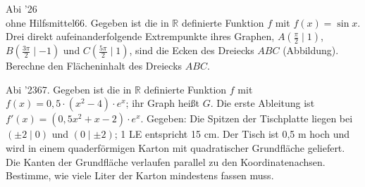 \documentclass[11pt]{article}
\begin{document}
\begin{pfaufg}{Abi ’26\\ohne Hilfsmittel}{66.}{}
Gegeben ist die in $\mathbb{R}$ definierte Funktion $f$ mit $f(x) = \sin x$. Drei direkt aufeinanderfolgende Extrempunkte ihres Graphen, $A\left(\tfrac{\pi}{2} \mid 1\right)$, $B\left(\tfrac{3\pi}{2} \mid -1\right)$ und $C\left(\tfrac{5\pi}{2} \mid 1\right)$, sind die Ecken des Dreiecks $ABC$ (Abbildung). Berechne den Flächeninhalt des Dreiecks $ABC$.
\par\smallskip\noindent {}\par
{}
\end{pfaufg}
\pfgruppe{}
\begin{pfaufg}{Abi ’23}{67.}{}
Gegeben ist die in $\mathbb{R}$ definierte Funktion $f$ mit $f(x) = 0{,}5\cdot(x^2 - 4)\cdot e^x$; ihr Graph heißt $G$. Die erste Ableitung ist $f'(x) = (0{,}5x^2 + x - 2)\cdot e^x$. Gegeben: Die Spitzen der Tischplatte liegen bei $(\pm 2 \mid 0)$ und $(0 \mid \pm 2)$; 1 LE entspricht 15 cm. Der Tisch ist 0,5 m hoch und wird in einem quaderförmigen Karton mit quadratischer Grundfläche geliefert. Die Kanten der Grundfläche verlaufen parallel zu den Koordinatenachsen. Bestimme, wie viele Liter der Karton mindestens fassen muss.
\end{pfaufg}
\pfgruppe{}
\end{document}
